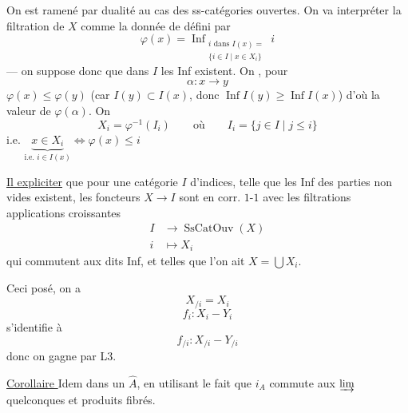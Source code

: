 On est ramené par dualité au cas des ss-catégories ouvertes. On va  interpréter la filtration de $X$ comme la donnée de
défini par
\[
\varphi(x)=\operatorname{Inf}_{\substack{i\text{ dans }I(x)=\\\{i\in I\mid x\in X_i\}}}i
\]
--- on suppose donc que dans $I$ les Inf  existent. On  , pour
\[
\alpha:x\longrightarrow y
\]
$\varphi(x)\leq\varphi(y)$ (car $I(y)\subset I(x)$, donc $\operatorname{Inf}I(y)\geq\operatorname{Inf}I(x)$) d'où la valeur de $\varphi(\alpha)$. On  
\[
X_i=\varphi^{-1}(I_i)\qquad\text{où}\qquad I_i=\{j\in I\mid j\leq i\}
\]
\deleted{\unsure{$\varphi$}} i.e. $\underbrace{x\in X_i}_{\text{i.e. }i\in I(x)}\Longleftrightarrow\varphi(x)\leq i$



\uline{Il  expliciter} que pour une catégorie $I$ d'indices, telle que les Inf des parties non vides existent, les foncteurs $X\longrightarrow I$ sont en corr. $1$-$1$ avec les filtrations  applications croissantes
\[
\begin{aligned}I&\longrightarrow\operatorname{SsCatOuv}(X)\\i&\longmapsto X_i\end{aligned}
\]
qui commutent aux dits Inf, et telles que l'on ait $X=\bigcup X_i$.

Ceci posé, on a
\[
X_{/i}=X_i
\]
\[
f_i:X_i\mathbin{-}Y_i
\]
s'identifie à
\[
f_{/i}:X_{/i}\mathbin{-}Y_{/i}
\]
donc on gagne par L3.

\margin{$\vert$}
\uline{Corollaire } Idem dans un $\widehat A$, en utilisant le fait que $i_A$ commute aux \uline{$\varinjlim$} quelconques et  produits fibrés.


